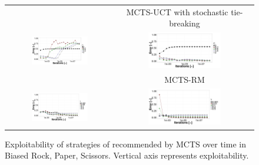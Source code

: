 \begin{figure}[t]
\begin{tabular}{cc}
\hspace{-0.85cm}{\small MCTS-UCT (fully deterministic)} & {\small MCTS-UCT with stochastic tie-breaking} \\ 
\hspace{-0.85cm}\includegraphics[width=0.55\textwidth]{figures/brps-MCTS-UCT.pdf} & \includegraphics[width=0.55\textwidth]{figures/brps-MCTS-UCT-NONDET.pdf}\\
\hspace{-0.85cm}{\small MCTS-Exp3} & {\small MCTS-RM} \\
\hspace{-0.85cm}\includegraphics[width=0.55\textwidth]{figures/brps-MCTS-EXP3.pdf} & \includegraphics[width=0.55\textwidth]{figures/brps-MCTS-RM.pdf}
\end{tabular}
\caption{Exploitability of strategies of recommended by MCTS over time in Biased Rock, Paper, Scissors. Vertical axis represents exploitability. \label{fig:expl-brps}}
\end{figure}

